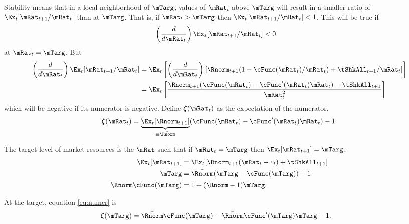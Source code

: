 \documentclass[./BufferStockTheory.tex]{subfiles}
\begin{document}
Stability means that in a local neighborhood of $\mTarg$, values of $\mRat_{t}$
above $\mTarg$ will result in a smaller ratio of $\Ex_{t}[{\mRat}%
_{t+1}/\mRat_{t}] $ than at $\mTarg$. That is, if $\mRat_{t} > \mTarg$ then $%
\Ex_{t}[\mRat_{t+1}/\mRat_{t}] < 1 $. This will be true if
\begin{equation}\begin{gathered}\begin{aligned}
\left(\frac{d}{d\mRat_t}\right) \Ex_t [{\mRat}_{t+1}/\mRat_t ]  & < 0 \label{eq:stable} \nonumber
\end{aligned}\end{gathered}\end{equation}
at $\mRat_{t}=\mTarg$.  But \providecommand{\numFunc}{\pmb{\zeta}}
\begin{align*}
\left( \frac{d}{d\mRat_{t}}\right) \Ex_{t}[{\mRat}_{t+1}/\mRat_{t}]  & = \Ex_{t}\left[
\left( \frac{d}{d\mRat_{t}}\right) \left[ {\Rnorm}_{t+1}(1-\cFunc(\mRat_{t})/\mRat_{t})+%
{\tShkAll}_{t+1}/\mRat_{t}\right] \right]  \nonumber \\
 & = \Ex_{t}\left[ \frac{{\Rnorm}_{t+1}(\cFunc(\mRat_{t})-\cFunc^{\prime}(\mRat_{t})\mRat_{t})-%
{\tShkAll}_{t+1}}{\mRat_{t}^{2}}\right]  \notag
\end{align*}
which will be negative if its numerator is negative. Define $\numFunc(\mRat_{t})$
as the expectation of the numerator,
\begin{equation}
\numFunc (\mRat_{t})=\underbrace{\Ex_{t}[{\Rnorm}_{t+1}]}_{\equiv \bar{\Rnorm}}(\cFunc(\mRat_{t})-\cFunc^{\prime}(\mRat_{t})\mRat_{t})-1. \label{eq:numer}
\end{equation}

The target level of market resources is the $\mRat$ such that if $\mRat_{t}=\mTarg$ then $\Ex_{t}[\mRat_{t+1}]=\mTarg$.
\begin{equation}\begin{gathered}\begin{aligned}
\Ex_{t}[{\mRat}_{t+1}]  & = \Ex_{t}[{\Rnorm}_{t+1}(\mRat_{t}-c_{t})+{%
\tShkAll}_{t+1}] \nonumber \\
\mTarg  & = \bar{\Rnorm}(\mTarg-\cFunc(\mTarg))+1  \nonumber \\
\bar{\Rnorm}\cFunc(\mTarg)  & = 1+(\bar{\Rnorm}-1)\mTarg  \label{eq:cstar}.
\end{aligned}\end{gathered}\end{equation}

At the target, equation \eqref{eq:numer} is
\begin{equation}\begin{gathered}\begin{aligned}
\numFunc(\mTarg)  & = \bar{\Rnorm}\cFunc(\mTarg) - \bar{\Rnorm}\cFunc^{\prime}(\mTarg)\mTarg - 1.  \nonumber 
\end{aligned}\end{gathered}\end{equation}
\end{document}
